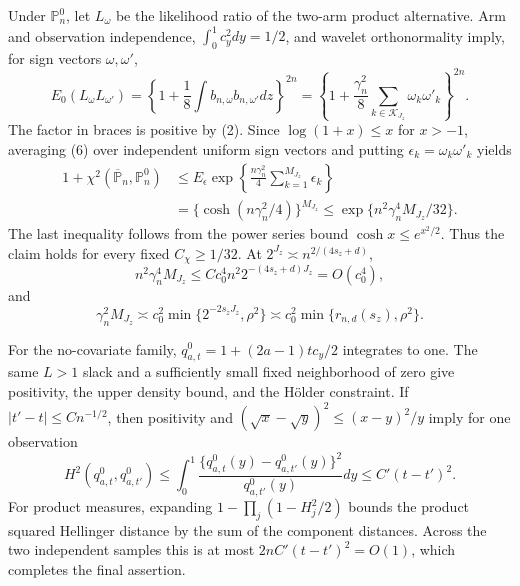 Under \(\mathbb P_n^0\), let \(L_\omega\) be the likelihood ratio of the two-arm product alternative.  Arm and observation independence, \(\int_0^1c_y^2dy=1/2\), and wavelet orthonormality imply, for sign vectors \(\omega,\omega'\),
\[
E_0(L_\omega L_{\omega'})
=\left\{1+\frac18\int b_{n,\omega}b_{n,\omega'}dz\right\}^{2n}
=\left\{1+\frac{\gamma_n^2}{8}
\sum_{k\in\mathcal K_{J_z}}\omega_k\omega'_k\right\}^{2n}.              \tag{6}
\]
The factor in braces is positive by (2).  Since \(\log(1+x)\le x\) for \(x>-1\), averaging (6) over independent uniform sign vectors and putting \(\epsilon_k=\omega_k\omega'_k\) yields
\[
\begin{aligned}
1+\chi^2(\overline{\mathbb P}_n,\mathbb P_n^0)
&\le E_\epsilon\exp\left\{\frac{n\gamma_n^2}{4}
\sum_{k=1}^{M_{J_z}}\epsilon_k\right\}\\
&=\{\cosh(n\gamma_n^2/4)\}^{M_{J_z}}
\le\exp\{n^2\gamma_n^4M_{J_z}/32\}.
\end{aligned}                                                             \tag{7}
\]
The last inequality follows from the power series bound \(\cosh x\le e^{x^2/2}\).  Thus the claim holds for every fixed \(C_\chi\ge1/32\).  At \(2^{J_z}\asymp n^{2/(4s_z+d)}\),
\[
n^2\gamma_n^4M_{J_z}
\le Cc_0^4n^2 2^{-(4s_z+d)J_z}=O(c_0^4),
\]
and
\[
\gamma_n^2M_{J_z}
\asymp c_0^2\min\{2^{-2s_zJ_z},\rho^2\}
\asymp c_0^2\min\{r_{n,d}(s_z),\rho^2\}.                                \tag{8}
\]

For the no-covariate family, \(q_{a,t}^0=1+(2a-1)tc_y/2\) integrates to one.  The same \(L>1\) slack and a sufficiently small fixed neighborhood of zero give positivity, the upper density bound, and the H\"older constraint.  If \(|t'-t|\le Cn^{-1/2}\), then positivity and \((\sqrt x-\sqrt y)^2\le(x-y)^2/y\) imply for one observation
\[
H^2(q_{a,t}^0,q_{a,t'}^0)
\le\int_0^1\frac{\{q_{a,t}^0(y)-q_{a,t'}^0(y)\}^2}{q_{a,t'}^0(y)}dy
\le C'(t-t')^2.
\]
For product measures, expanding \(1-\prod_j(1-H_j^2/2)\) bounds the product squared Hellinger distance by the sum of the component distances.  Across the two independent samples this is at most \(2nC'(t-t')^2=O(1)\), which completes the final assertion.